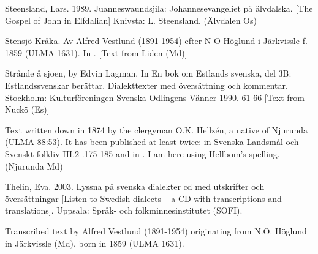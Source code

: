 \item 

\label{bkm:Ref150065761}Steensland, Lars. 1989. Juanneswaundsjila: Johannesevangeliet på älvdalska. [The Gospel of John in Elfdalian] Knivsta: L. Steensland. (Älvdalen Os)

\item 

\label{bkm:Ref154221412}\label{bkm:Ref154302630}Stensjö-Kråka. Av Alfred Vestlund (1891-1954) efter N O Höglund i Järkvissle f. 1859 (ULMA 1631). In \citet[17-19]{Hellbom1980}. [Text from Liden (Md)]

\item 

\label{bkm:Ref223343666}Strånde å sjoen, by Edvin Lagman. In En bok om Estlands svenska, del 3B: Estlandssvenskar berättar. Dialekttexter med översättning och kommentar. Stockholm: Kulturföreningen Svenska Odlingens Vänner 1990.  61-66 [Text from Nuckö (Es)]

\item 

Text written down in 1874 by the clergyman O.K. Hellzén, a native of Njurunda (ULMA 88:53). It has been published at least twice: in Svenska Landsmål och Svenskt folkliv III.2 .175-185 and in \citet[92-107]{Hellbom1980}. I am here using Hellbom’s spelling. (Njurunda Md)

\item 

Thelin, Eva. 2003. Lyssna på svenska dialekter cd med utskrifter och översättningar [Listen to Swedish dialects – a CD with transcriptions and translations]. Uppsala: Språk- och folkminnesinstitutet (SOFI).


\item 

Transcribed text by Alfred Vestlund (1891-1954) originating from N.O. Höglund in Järkvissle (Md), born in 1859 (ULMA 1631).

